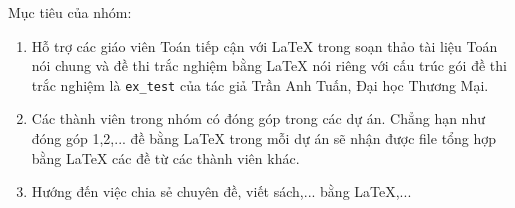 \documentclass[12pt,a4paper,oneside]{book}
\begin{document}
\noindent Mục tiêu của nhóm: 
\begin{enumerate}
\item Hỗ trợ các giáo viên Toán tiếp cận với \LaTeX{} trong soạn thảo tài liệu Toán nói chung và đề thi trắc nghiệm bằng \LaTeX{} nói riêng với cấu trúc gói đề thi trắc nghiệm là \texttt{ex\_test} của tác giả Trần Anh Tuấn, Đại học Thương Mại.
\item Các thành viên trong nhóm có đóng góp trong các dự án. Chẳng hạn như đóng góp 1,2,... đề bằng \LaTeX{} trong mỗi dự án sẽ nhận được file tổng hợp bằng \LaTeX{} các đề từ các thành viên khác.
\item Hướng đến việc chia sẻ chuyên đề, viết sách,... bằng \LaTeX,...
\end{enumerate}
    
     
     
      
       
     
     
   
      
      
       
        
       
        
       
       
      
      
       
        
        
       
       
       
      
        
     
       
       
       
       
       
        


      
\end{document}
